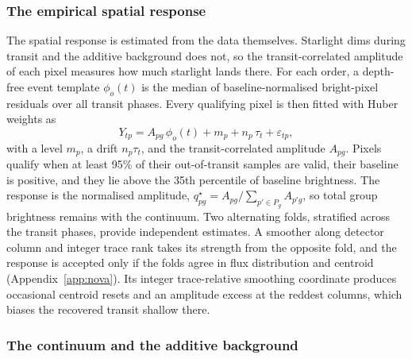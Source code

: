 \subsubsection{The empirical spatial response}


The spatial response is estimated from the data themselves. Starlight
dims during transit and the additive background does not, so the
transit-correlated amplitude of each pixel measures how much starlight
lands there. For each order, a depth-free
event template $\phi_o(t)$ is the median of baseline-normalised
bright-pixel residuals over all transit phases. Every qualifying pixel is
then fitted with Huber weights as
\begin{equation}
 Y_{tp} = A_{pg}\,\phi_{o}(t) + m_p + n_p\,\tau_t + \varepsilon_{tp},
 \label{eq:qstar-fit}
\end{equation}
with a level $m_p$, a drift $n_p\tau_t$, and the transit-correlated
amplitude $A_{pg}$. Pixels qualify when at least 95\% of their
out-of-transit samples are valid, their baseline is positive, and they
lie above the 35th percentile of baseline brightness. The response is the
normalised amplitude,
$q^\star_{pg}=A_{pg}/\sum_{p'\in P_g}A_{p'g}$, so total group brightness
remains with the continuum. Two alternating folds, stratified across the
transit phases, provide independent estimates. A smoother along
detector column and integer trace rank takes its strength from the
opposite fold, and the response is accepted only if the folds
agree in flux distribution and centroid (Appendix~\ref{app:nova}). Its
integer trace-relative smoothing coordinate produces occasional centroid
resets and an amplitude excess at the reddest columns, which biases the
recovered transit shallow there.

\subsubsection{The continuum and the additive background}


